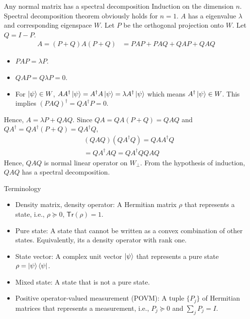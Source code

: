 \documentclass[10pt]{beamer}
\newcommand{\Tr}{\mathsf{Tr}}
\newcommand\emm[1]{\textcolor{redorange}{{#1}}}
\begin{document}
\begin{frame}{Any normal matrix has a spectral decomposition}
\emm{Induction on the dimension} $n$. Spectral decomposition theorem obviously holds for $n=1$.
$A$ has a eigenvalue $\lambda$ and corresponding eigenspace $W$.
Let $P$ be the orthogonal projection onto $W$.
Let $Q=I-P$.
\begin{align*}
A=(P+Q)A(P+Q)&=PAP+PAQ+QAP+QAQ
\end{align*}
\begin{itemize}
\item $PAP=\lambda P$.
\item $QAP=Q\lambda P=0$.
\item For $\ket{\psi}\in W$, $A A^\dagger\ket{\psi} = A^\dagger A\ket{\psi} = \lambda A^\dagger\ket{\psi}$ which means $A^\dagger\ket{\psi}\in W$.
This implies $(PAQ)^\dagger = QA^\dagger P = 0$.
\end{itemize}

\vspace{1em}
Hence, $A=\lambda P + QAQ$.
Since $QA=QA(P+Q)=QAQ$ and $QA^\dagger = QA^\dagger(P+Q) = QA^\dagger Q$,
\begin{align*}
&(QAQ)(QA^\dagger Q) = QA A^\dagger Q\\
&= QA^\dagger AQ = QA^\dagger QQ AQ
\end{align*}
Hence, $QAQ$ is normal linear operator on $W_\perp$.
From the hypothesis of induction, $QAQ$ has a spectral decomposition.
\end{frame}

\begin{frame}{Terminology}
\begin{itemize}
\setlength{\itemsep}{1.5em}
\item \emm{Density matrix}, density operator: A Hermitian matrix $\rho$ that represents a state, i.e., $\rho\succeq 0$, $\Tr(\rho)=1$.
\item \emm{Pure state}: A state that cannot be written as a convex combination of other states.
Equivalently, its a density operator with rank one.
\item \emm{State vector}: A complex unit vector $\ket{\psi}$ that represents a pure state $\rho=\ket{\psi}\bra{\psi}$.
\item \emm{Mixed state}: A state that is not a pure state.
\item Positive operator-valued measurement (\emm{POVM}): A tuple  $\{P_j\}$ of Hermitian matrices that represents a measurement, i.e.,
$P_j\succeq0$ and $\sum_jP_j=I$.
\end{itemize}
\end{frame}
\end{document}
